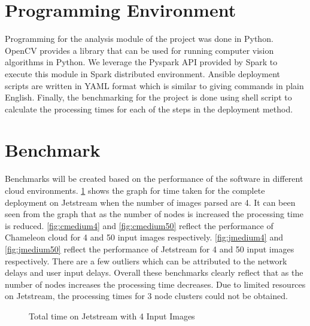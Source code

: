 \documentclass[9pt,twocolumn,twoside]{../../styles/osajnl}
\begin{document}
\section{Programming Environment}
Programming for the analysis module of the project was done in Python. OpenCV provides a library that can be used for running computer vision algorithms in Python. We leverage the Pyspark  API provided by Spark to execute this module in Spark distributed environment. Ansible deployment scripts are written in YAML format which is similar to giving commands in plain English. Finally, the benchmarking for the project is done using shell script to calculate the processing times for each of the steps in the deployment method.

\section{Benchmark}
Benchmarks will be created based on the performance of the software in
different cloud environments. \ref{fig:jmedium} shows the graph for time taken for the complete deployment on Jetstream when the number of images parsed are 4. It can been seen from the graph that as the number of nodes is increased the processing time is reduced. \ref{fig:cmedium4} and \ref{fig:cmedium50} reflect the performance of Chameleon cloud for 4 and 50 input images respectively. \ref{fig:jmedium4} and \ref{fig:jmedium50} reflect the performance of Jetstream for 4 and 50 input images respectively. There are a few outliers which can be attributed to the network delays and user input delays. Overall these benchmarks clearly reflect that as the number of nodes increases the processing time decreases. Due to limited resources on Jetstream, the processing times for 3 node clusters could not be obtained. 

\begin{figure}[htbp]
\centering
{}
\caption{Total time on Jetstream with 4 Input Images}
\label{fig:jmedium}
\end{figure}
\end{document}
